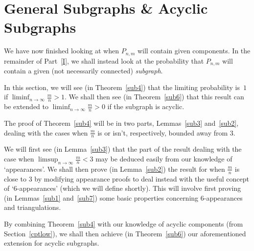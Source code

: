 \documentclass{article}
\newtheorem{Proof of Theorem}{Proof of Theorem}
\begin{document}
\newpage
\section{General Subgraphs \& Acyclic Subgraphs} \label{sub}















We have now finished looking at when $P_{n,m}$ will contain given components.
In the remainder of Part~\ref{I},
we shall instead look at the probability that $P_{n,m}$ will contain a given 
(not necessarily connected) \textit{subgraph}.

In this section, we will see (in Theorem~\ref{sub4}) that the limiting probability is~$1$ 
if $\liminf_{n \to \infty} \frac{m}{n} > 1$.
We shall then see (in Theorem~\ref{sub6})
that this result can be extended to $\liminf_{n \to \infty} \frac{m}{n} > 0$ if the subgraph is acyclic.

The proof of Theorem~\ref{sub4} will be in two parts, Lemmas~\ref{sub3} and~\ref{sub2},
dealing with the cases when $\frac{m}{n}$ is or isn't, respectively, bounded away from $3$.

We will first see (in Lemma~\ref{sub3}) that the part of the result dealing with the case when 
$\limsup_{n \to \infty} \frac{m}{n} < 3$ 
may be deduced easily from our knowledge of `appearances'.
We shall then prove (in Lemma~\ref{sub2}) the result for when $\frac{m}{n}$ is close to $3$ by modifying
appearance proofs to deal instead with the useful concept of `$6$-appearances'
(which we will define shortly).
This will involve first proving (in Lemmas~\ref{sub1} and~\ref{sub7})
some basic properties concerning $6$-appearances and triangulations.

By combining Theorem~\ref{sub4} with our knowledge of acyclic components
(from Section~\ref{cptlow}),
we shall then achieve (in Theorem~\ref{sub6}) our aforementioned extension for acyclic subgraphs.





\begin{figure}[omitted: a diagram of this paper's results, not reproduced here]\end{figure}
\end{document}
